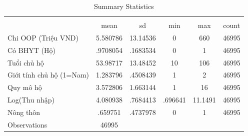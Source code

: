 \begin{table}[htbp]\centering
\def\sym#1{\ifmmode^{#1}\else\(^{#1}\)\fi}
\caption{Summary Statistics}
\begin{tabular}{l*{1}{ccccc}}
\hline\hline
                    &\multicolumn{5}{c}{}                                            \\
                    &        mean&          sd&         min&         max&       count\\
\hline
Chi OOP (Triệu VND) &    5.580786&    13.14536&           0&         660&       46995\\
Có BHYT (Hộ)        &    .9708054&    .1683534&           0&           1&       46995\\
Tuổi chủ hộ         &    53.98717&    13.48452&          10&         106&       46995\\
Giới tính chủ hộ (1=Nam)&    1.283796&    .4508439&           1&           2&       46995\\
Quy mô hộ           &    3.572806&    1.663144&           1&          16&       46995\\
Log(Thu nhập)       &    4.080938&    .7684413&     .696641&     11.1491&       46995\\
Nông thôn           &     .659751&    .4737978&           0&           1&       46995\\
\hline
Observations        &       46995&            &            &            &            \\
\hline\hline
\end{tabular}
\end{table}
